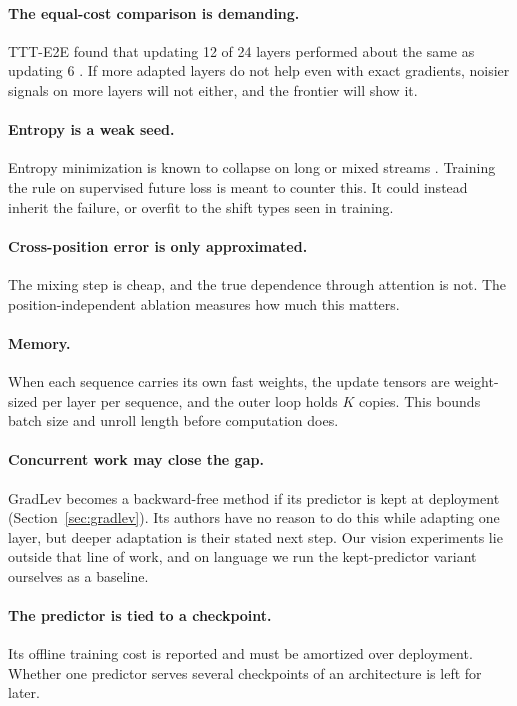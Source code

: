 \documentclass{article}
\begin{document}
\paragraph{The equal-cost comparison is demanding.} TTT-E2E found that updating
12 of 24 layers performed about the same as updating 6
\parencite{tandon2025ttte2e}. If more adapted layers do not help even with
exact gradients, noisier signals on more layers will not either, and the
frontier will show it.

\paragraph{Entropy is a weak seed.} Entropy minimization is known to collapse
on long or mixed streams \parencite{niu2023sar,wang2022cotta}. Training the
rule on supervised future loss is meant to counter this. It could instead
inherit the failure, or overfit to the shift types seen in training.

\paragraph{Cross-position error is only approximated.} The mixing step is
cheap, and the true dependence through attention is not. The
position-independent ablation measures how much this matters.

\paragraph{Memory.} When each sequence carries its own fast weights, the update
tensors are weight-sized per layer per sequence, and the outer loop holds $K$
copies. This bounds batch size and unroll length before computation does.

\paragraph{Concurrent work may close the gap.} GradLev becomes a backward-free
method if its predictor is kept at deployment
(Section~\ref{sec:gradlev}). Its authors have no reason to do this while
adapting one layer, but deeper adaptation is their stated next step. Our vision
experiments lie outside that line of work, and on language we run the
kept-predictor variant ourselves as a baseline.

\paragraph{The predictor is tied to a checkpoint.} Its offline training cost is
reported and must be amortized over deployment. Whether one predictor serves
several checkpoints of an architecture is left for later.
\end{document}
